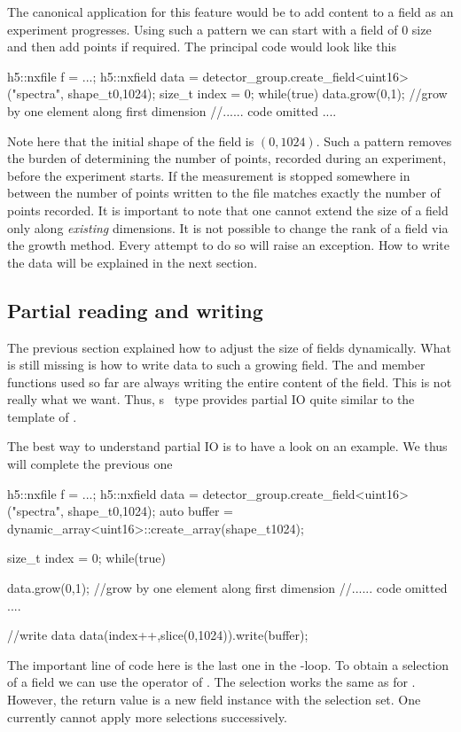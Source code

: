 The canonical application for this feature would be to add content to a field 
as an experiment progresses. Using such a pattern we can start with a field 
of $0$ size and then add points if required. The principal code would look like
this
\begin{cppcode}
h5::nxfile f = ...;
h5::nxfield data = detector_group.create_field<uint16>("spectra",
                                                       shape_t{0,1024});
size_t index = 0;
while(true)
{
    data.grow(0,1); //grow by one element along first dimension
    //...... code omitted ....
}
\end{cppcode}
Note here that the initial shape of the field is $(0,1024)$. Such a pattern 
removes the burden of determining the number of points, recorded during 
an experiment, before the experiment starts. If the measurement is stopped 
somewhere in between the number of points written to the file matches exactly
the number of points recorded.  
It is important to note that one cannot extend the size of a field only along
\emph{existing} dimensions. It is not possible to change the rank of a field via
the growth method. Every attempt to do so will raise an 
exception.
How to write the data will be explained in the next section.

\subsection{Partial reading and writing}

The previous section explained how to adjust the size of fields dynamically. 
What is still missing is how to write data to such a growing field. The 
 and  member functions used so far are always writing
the entire content of the field. This is not really what we want. 
Thus, \libpniio s \nxfield\ type provides partial IO quite similar to the 
 template of \libpnicore. 

The best way to understand partial IO is to have a look on an example. We thus
will complete the previous one 

\begin{cppcode}
h5::nxfile f = ...;
h5::nxfield data = detector_group.create_field<uint16>("spectra",
                                                       shape_t{0,1024});
auto buffer = dynamic_array<uint16>::create_array(shape_t{1024});

size_t index = 0;
while(true)
{
    data.grow(0,1); //grow by one element along first dimension
    //...... code omitted ....

    //write data
    data(index++,slice(0,1024)).write(buffer);
}
\end{cppcode}
The important line of code here is the last one in the -loop. To obtain
a selection of a field we can use the \cpp{()} operator of \nxfield. 
The selection works the same as for . However, the return value is 
a new field instance with the selection set. One currently cannot apply more
selections successively. 


